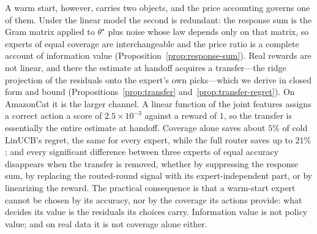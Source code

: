 \documentclass{article}
\theoremstyle{definition}
\theoremstyle{remark}
\theoremstyle{remark}
\begin{document}
A warm start, however, carries two objects, and the price accounting governs
one of them. Under the linear model the second is redundant: the response sum
is the Gram matrix applied to $\theta^\star$ plus noise whose law depends only
on that matrix, so experts of equal coverage are interchangeable and the price
ratio is a complete account of information value
(Proposition~\ref{prop:response-sum}). Real rewards are not linear, and there
the estimate at handoff acquires a transfer---the ridge projection of the
residuals onto the expert's own picks---which we derive in closed form and
bound (Propositions~\ref{prop:transfer} and~\ref{prop:transfer-regret}). On
AmazonCat it is the larger channel. A linear function of the joint features
assigns a correct action a score of $2.5\times10^{-3}$ against a reward of $1$,
so the transfer is essentially the entire estimate at handoff. Coverage alone
saves about $5\%$ of cold LinUCB's regret, the same for every expert, while
the full router saves up to $21\%$; and every significant difference between
three experts of equal accuracy disappears when the transfer is removed,
whether by suppressing the response sum, by replacing the routed-round signal
with its expert-independent part, or by linearizing the reward. The practical
consequence is that a warm-start expert cannot be chosen by its accuracy, nor
by the coverage its actions provide: what decides its value is the residuals
its choices carry. Information value is not policy value; and on real data it
is not coverage alone either.
\end{document}

